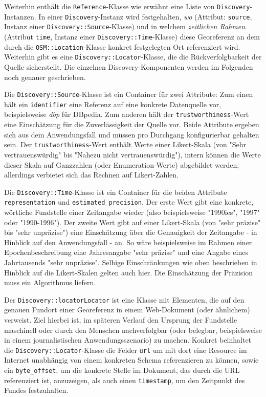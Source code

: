 Weiterhin enthält die \texttt{Reference}-Klasse wie erwähnt eine Liste von \texttt{Discovery}-Instanzen. In einer \texttt{Discovery}-Instanz wird festgehalten, \textit{wo} (Attribut: \texttt{source}, Instanz einer \texttt{Discovery::Source}-Klasse) und in welchem \textit{zeitlichen Rahmen} (Attribut \texttt{time}, Instanz einer \texttt{Discovery::Time}-Klasse) diese Georeferenz an dem durch die \texttt{OSM::Location}-Klasse konkret festgelegten Ort referenziert wird. Weiterhin gibt es eine \texttt{Discovery::Locator}-Klasse, die die Rückverfolgbarkeit der Quelle sicherstellt. Die einzelnen Discovery-Komponenten werden im Folgenden noch genauer geschrieben.

Die \texttt{Discovery::Source}-Klasse ist ein Container für zwei Attribute: Zum einen hält ein \texttt{identifier} eine Referenz auf eine konkrete Datenquelle vor, beispielsweise \textit{dbp} für DBpedia. Zum anderen hält der \texttt{trustworthiness}-Wert eine Einschätzung für die Zuverlässigkeit der Quelle vor. Beide Attribute ergeben sich aus dem Anwendungsfall und müssen pro Durchgang konfigurierbar gehalten sein. Der \texttt{trustworthiness}-Wert enthält Werte einer Likert-Skala (von "Sehr vertrauenswürdig" bis "Nahezu nicht vertrauenswürdig"), intern können die Werte dieser Skala auf Ganzzahlen (oder Enumeration-Werte) abgebildet werden, allerdings verbietet sich das Rechnen auf Likert-Zahlen.

Die \texttt{Discovery::Time}-Klasse ist ein Container für die beiden Attribute \texttt{representation} und \texttt{estimated\_precision}. Der erste Wert gibt eine konkrete, wörtliche Fundstelle einer Zeitangabe wieder (also beispielsweise "1990ies", "1997" oder "1990-1996"). Der zweite Wert gibt auf einer Likert-Skala (von "sehr präzise" bis "sehr unpräzise") eine Einschätzung über die Genauigkeit der Zeitangabe - in Hinblick auf den Anwendungsfall - an. So wäre beispielsweise im Rahmen einer Epochenbeschreibung eine Jahresangabe "sehr präzise" und eine Angabe eines Jahrtausends "sehr unpräzise". Selbige Einschränkungen wie oben beschrieben in Hinblick auf die Likert-Skalen gelten auch hier. Die Einschätzung der Präzision muss ein Algorithmus liefern.

Der \texttt{Discovery::locatorLocator} ist eine Klasse mit Elementen, die auf den genauen Fundort einer Georeferenz in einem Web-Dokument (oder ähnlichem) verweist. Ziel hierbei ist, im späteren Verlauf den Ursprung der Fundstelle maschinell oder durch den Menschen nachverfolgbar (oder belegbar, beispielsweise in einem journalistischen Anwendungsszenario) zu machen. Konkret beinhaltet die \texttt{Discovery::Locator}-Klasse die Felder \texttt{url} um mit dort eine Resource im Internet unabhängig von einem konkreten Schema referenzieren zu können, sowie ein \texttt{byte\_offset}, um die konkrete Stelle im Dokument, das durch die URL referenziert ist, anzuzeigen, als auch einen \texttt{timestamp}, um den Zeitpunkt des Fundes festzuhalten.
  
